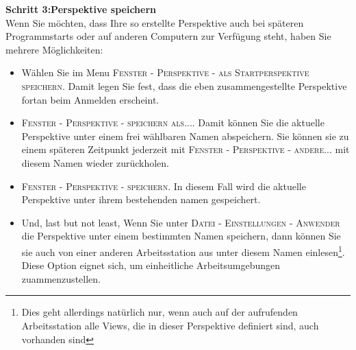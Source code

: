 \bigskip
\textbf{Schritt 3:Perspektive speichern}\\
Wenn Sie möchten, dass Ihre so erstellte Perspektive auch bei späteren Programmstarts oder auf anderen Computern zur Verfügung steht, haben Sie mehrere Möglichkeiten:
\begin{itemize}
\item Wählen Sie im Menu \textsc{Fenster - Perspektive - als Startperspektive speichern}. Damit legen Sie fest, dass die eben zusammengestellte Perspektive fortan beim Anmelden erscheint.
\item \textsc{Fenster - Perspektive - speichern als...}. Damit können Sie die aktuelle Perspektive unter einem frei wählbaren Namen abspeichern. Sie können sie zu einem späteren Zeitpunkt jederzeit mit \textsc{Fenster - Perspektive - andere...} mit diesem Namen wieder zurückholen.
\item \textsc{Fenster - Perspektive - speichern}. In diesem Fall wird die aktuelle Perspektive unter ihrem bestehenden namen gespeichert.
\item Und, last but not least, Wenn Sie unter \textsc{Datei - Einstellungen - Anwender} die Perspektive unter einem bestimmten Namen speichern, dann können Sie sie auch von einer anderen Arbeitsstation aus unter diesem Namen einlesen\footnote{Dies geht allerdings natürlich nur, wenn auch auf der aufrufenden Arbeitsstation alle Views, die in dieser Perspektive definiert sind, auch vorhanden sind}. Diese Option eignet sich, um einheitliche Arbeitsumgebungen zuammenzustellen.
\end{itemize}

